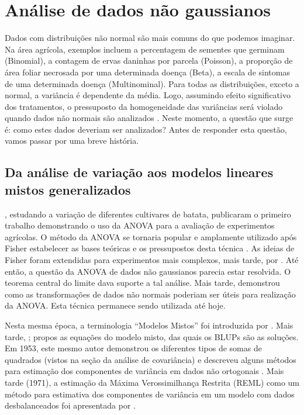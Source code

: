\documentclass[
]{book}
\begin{document}
\hypertarget{general}{%
\section{Análise de dados não gaussianos}\label{general}}

Dados com distribuições não normal são mais comuns do que podemos imaginar. Na área agrícola, exemplos incluem a percentagem de sementes que germinam (Binomial), a contagem de ervas daninhas por parcela (Poisson), a proporção de área foliar necrosada por uma determinada doença (Beta), a escala de sintomas de uma determinada doença (Multinominal). Para todas as distribuições, exceto a normal, a variância é dependente da média. Logo, assumindo efeito significativo dos tratamentos, o pressuposto da homogeneidade das variâncias será violado quando dados não normais são analizados \citep{Stroup2015}. Neste momento, a questão que surge é: como estes dados deveriam ser analizados? Antes de responder esta questão, vamos passar por uma breve história.

\hypertarget{da-anuxe1lise-de-variauxe7uxe3o-aos-modelos-lineares-mistos-generalizados}{%
\subsection{Da análise de variação aos modelos lineares mistos generalizados}\label{da-anuxe1lise-de-variauxe7uxe3o-aos-modelos-lineares-mistos-generalizados}}

\citet{Fisher1923}, estudando a variação de diferentes cultivares de batata, publicaram o primeiro trabalho demonstrando o uso da ANOVA para a avaliação de experimentos agrícolas. O método da ANOVA se tornaria popular e amplamente utilizado após Fisher estabelecer as bases teóricas e os pressupostos desta técnica \citep{Fisher1925, Fisher1935}. As ideias de Fisher foram extendidas para experimentos mais complexos, mais tarde, por \citet{Yates1940}. Até então, a questão da ANOVA de dados não gaussianos parecia estar resolvida. O teorema central do limite dava suporte a tal análise. Mais tarde, \citet{Bartlett1947} demonstrou como as transformações de dados não normais poderiam ser úteis para realização da ANOVA. Esta técnica permanece sendo utilizada até hoje.

Nesta mesma época, a terminologia ``Modelos Mistos''  foi introduzida por \citet{Eisenhart1947}. Mais tarde, \citet{Henderson1949}; \citet{Henderson1950} propos as equações do modelo misto, das quais os BLUPs são as soluções. Em 1953, este mesmo autor demonstrou os diferentes tipos de somas de quadrados (vistos na seção da análise de covariância) e descreveu alguns métodos para estimação dos componentes de variância em dados não ortogonais \citep{Henderson1953}. Mais tarde (1971), a estimação da Máxima Verossimilhança Restrita (REML) como um método para estimativa dos componentes de variância em um modelo com dados desbalanceados foi apresentada por \citet{Patterson1971}.
\end{document}
